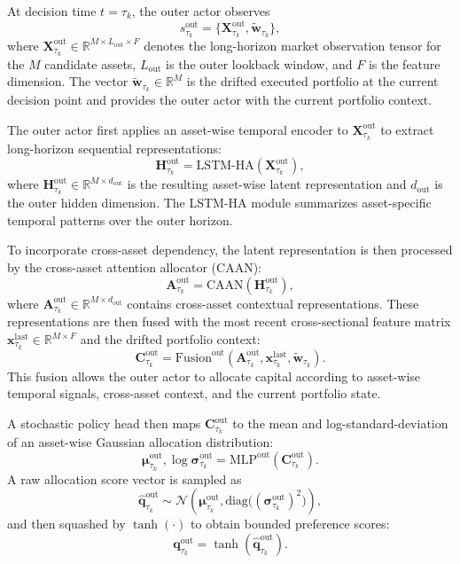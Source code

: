 \documentclass[letterpaper]{article} %
\begin{document}
At decision time \(t=\tau_k\), the outer actor observes
\[
s^{\mathrm{out}}_{\tau_k}
=
\bigl\{\mathbf{X}^{\mathrm{out}}_{\tau_k},\tilde{\mathbf{w}}_{\tau_k}\bigr\},
\]
where \(\mathbf{X}^{\mathrm{out}}_{\tau_k}\in\mathbb{R}^{M\times L_{\mathrm{out}}\times F}\) denotes the long-horizon market observation tensor for the \(M\) candidate assets, \(L_{\mathrm{out}}\) is the outer lookback window, and \(F\) is the feature dimension. The vector \(\tilde{\mathbf{w}}_{\tau_k}\in\mathbb{R}^{M}\) is the drifted executed portfolio at the current decision point and provides the outer actor with the current portfolio context.

The outer actor first applies an asset-wise temporal encoder to \(\mathbf{X}^{\mathrm{out}}_{\tau_k}\) to extract long-horizon sequential representations:
\[
\mathbf{H}^{\mathrm{out}}_{\tau_k}
=
\mathrm{LSTM\mbox{-}HA}\!\left(\mathbf{X}^{\mathrm{out}}_{\tau_k}\right),
\]
where \(\mathbf{H}^{\mathrm{out}}_{\tau_k}\in\mathbb{R}^{M\times d_{\mathrm{out}}}\) is the resulting asset-wise latent representation and \(d_{\mathrm{out}}\) is the outer hidden dimension. The LSTM-HA module summarizes asset-specific temporal patterns over the outer horizon.

To incorporate cross-asset dependency, the latent representation is then processed by the cross-asset attention allocator (CAAN):
\[
\mathbf{A}^{\mathrm{out}}_{\tau_k}
=
\mathrm{CAAN}\!\left(
\mathbf{H}^{\mathrm{out}}_{\tau_k}
\right),
\]
where \(\mathbf{A}^{\mathrm{out}}_{\tau_k}\in\mathbb{R}^{M\times d_{\mathrm{out}}}\) contains cross-asset contextual representations. These representations are then fused with the most recent cross-sectional feature matrix \(\mathbf{x}^{\mathrm{last}}_{\tau_k}\in\mathbb{R}^{M\times F}\) and the drifted portfolio context:
\[
\mathbf{C}^{\mathrm{out}}_{\tau_k}
=
\mathrm{Fusion}^{\mathrm{out}}\!\left(
\mathbf{A}^{\mathrm{out}}_{\tau_k},
\mathbf{x}^{\mathrm{last}}_{\tau_k},
\tilde{\mathbf{w}}_{\tau_k}
\right).
\]
This fusion allows the outer actor to allocate capital according to asset-wise temporal signals, cross-asset context, and the current portfolio state.

A stochastic policy head then maps \(\mathbf{C}^{\mathrm{out}}_{\tau_k}\) to the mean and log-standard-deviation of an asset-wise Gaussian allocation distribution:
\[
\boldsymbol{\mu}^{\mathrm{out}}_{\tau_k},
\log \boldsymbol{\sigma}^{\mathrm{out}}_{\tau_k}
=
\mathrm{MLP}^{\mathrm{out}}\!\left(\mathbf{C}^{\mathrm{out}}_{\tau_k}\right).
\]
A raw allocation score vector is sampled as
\[
\hat{\mathbf{q}}^{\mathrm{out}}_{\tau_k}
\sim
\mathcal{N}\!\left(
\boldsymbol{\mu}^{\mathrm{out}}_{\tau_k},
\mathrm{diag}\bigl((\boldsymbol{\sigma}^{\mathrm{out}}_{\tau_k})^2\bigr)
\right),
\]
and then squashed by \(\tanh(\cdot)\) to obtain bounded preference scores:
\[
\mathbf{q}^{\mathrm{out}}_{\tau_k}
=
\tanh\!\left(\hat{\mathbf{q}}^{\mathrm{out}}_{\tau_k}\right).
\]
\end{document}
